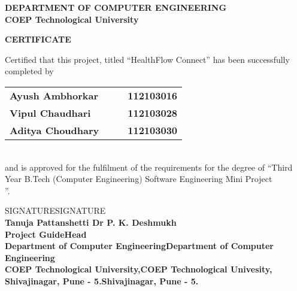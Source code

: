 \thispagestyle{empty}
\linespread{2}
\begin{center}			%
	\Large{\bf{DEPARTMENT OF COMPUTER ENGINEERING\\ 
	       COEP Technological University\\}}	
\end{center}

\vspace{20pt}			%

\begin{center}
	\Large{\bf{CERTIFICATE\\}}
\end{center}

\vspace{20pt}

\linespread{2}			%
\selectfont
\large{
Certified that this project, titled ``HealthFlow Connect''
has been successfully completed by \\ 
\begin{table}[htbp]
	\begin{center}
	\begin{tabular}{ l c c l }
	\Large\bf{Ayush Ambhorkar} & & & \Large\bf{112103016} \\[0.3cm] 
        \Large\bf{Vipul Chaudhari} & & & \Large\bf{112103028} \\[0.3cm] 
        \Large\bf{Aditya Choudhary} & & & \Large\bf{112103030} \\[0.3cm]

	\end{tabular}
	\end{center}
	\end{table} \\
and is approved for the fulfilment of the requirements for the degree of 
``Third Year B.Tech (Computer Engineering) Software Engineering Mini Project\\''.
}

\vspace{100pt}

\begin{center}		%

SIGNATURESIGNATURE\\
\normalsize{\bf{Tanuja Pattanshetti Dr P. K. Deshmukh\\
Project GuideHead}\\
Department of Computer EngineeringDepartment of Computer Engineering\\
COEP Technological University,COEP Technological Univesity,\\
Shivajinagar, Pune - 5.Shivajinagar, Pune - 5.}
\end{center}